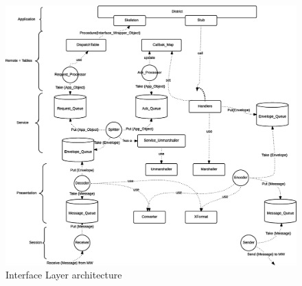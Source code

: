 

\begin{figure}[H]
  \centering
  \includegraphics[width=\columnwidth]{images/implementation/il-overall.eps}
  \caption{Interface Layer architecture}
  \label{fig:impl-il-arch}
\end{figure}

